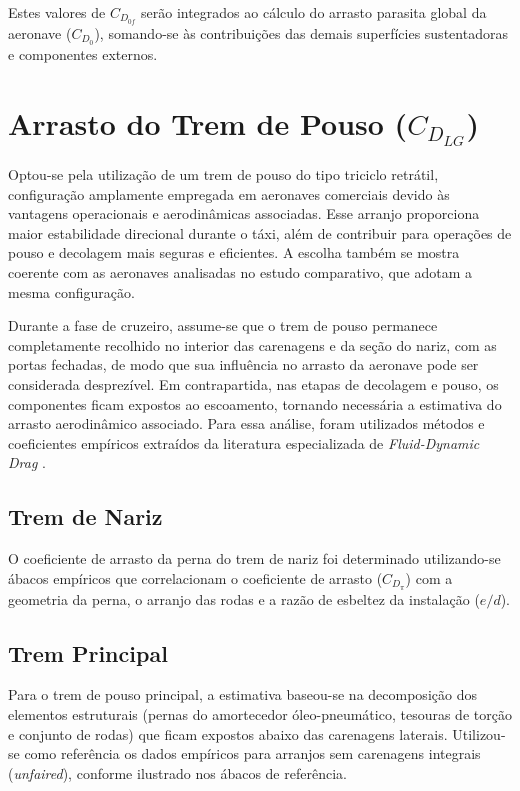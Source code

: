 Estes valores de $C_{D_{0f}}$ serão integrados ao cálculo do arrasto parasita global da aeronave ($C_{D_0}$), somando-se às contribuições das demais superfícies sustentadoras e componentes externos.

\section{Arrasto do Trem de Pouso ($C_{D_{LG}}$)}

Optou-se pela utilização de um trem de pouso do tipo triciclo retrátil, configuração amplamente empregada em aeronaves comerciais devido às vantagens operacionais e aerodinâmicas associadas. Esse arranjo proporciona maior estabilidade direcional durante o táxi, além de contribuir para operações de pouso e decolagem mais seguras e eficientes. A escolha também se mostra coerente com as aeronaves analisadas no estudo comparativo, que adotam a mesma configuração.

Durante a fase de cruzeiro, assume-se que o trem de pouso permanece completamente recolhido no interior das carenagens e da seção do nariz, com as portas fechadas, de modo que sua influência no arrasto da aeronave pode ser considerada desprezível. Em contrapartida, nas etapas de decolagem e pouso, os componentes ficam expostos ao escoamento, tornando necessária a estimativa do arrasto aerodinâmico associado. Para essa análise, foram utilizados métodos e coeficientes empíricos extraídos da literatura especializada de \textit{Fluid-Dynamic Drag} \cite{Hoerner}.

\subsection{Trem de Nariz}
O coeficiente de arrasto da perna do trem de nariz foi determinado utilizando-se ábacos empíricos que correlacionam o coeficiente de arrasto ($C_{D_\pi}$) com a geometria da perna, o arranjo das rodas e a razão de esbeltez da instalação ($e/d$). %

\subsection{Trem Principal}
Para o trem de pouso principal, a estimativa baseou-se na decomposição dos elementos estruturais (pernas do amortecedor óleo-pneumático, tesouras de torção e conjunto de rodas) que ficam expostos abaixo das carenagens laterais. Utilizou-se como referência os dados empíricos para arranjos sem carenagens integrais (\textit{unfaired}), conforme ilustrado nos ábacos de referência. %

